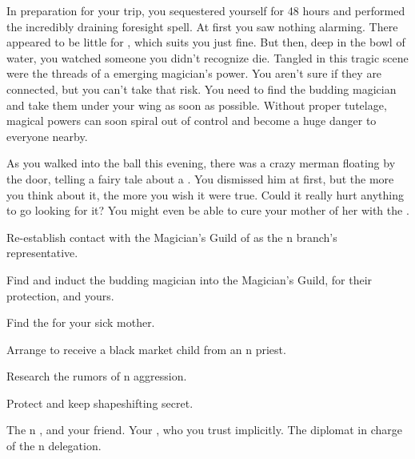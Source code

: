 \documentclass[char]{NeptuneBall}
\begin{document}
In preparation for your trip, you sequestered yourself for 48 hours and performed the incredibly draining foresight spell. At first you saw nothing alarming. There appeared to be little for \cPrince{}, which suits you just fine. But then, deep in the bowl of water, you watched someone you didn't recognize die. Tangled in this tragic scene were the threads of a emerging magician's power. You aren't sure if they are connected, but you can't take that risk. You need to find the budding magician and take them under your wing as soon as possible. Without proper tutelage, magical powers can soon spiral out of control and become a huge danger to everyone nearby.

As you walked into the ball this evening, there was a crazy merman floating by the door, telling a fairy tale about a \iWishingStone{\MYname}. You dismissed him at first, but the more you think about it, the more you wish it were true. Could it really hurt anything to go looking for it? You might even be able to cure your mother of her \ppolio{} with the \iWishingStone{\MYname}.

\begin{itemz}[Goals]
  \item Re-establish contact with the Magician's Guild of \pAtlantis{} as the \pPacifica{}n branch's representative.
  \item Find and induct the budding magician into the Magician's Guild, for their protection, and yours.
	\item Find the \iWishingStone{\MYname} for your sick mother.
  \item Arrange to receive a black market child from an \pAtlantis{}n priest.
  \item Research the rumors of \pIndia{}n aggression.
  \item Protect \cPrince{} and keep \cPrince{\their} shapeshifting secret.
\end{itemz}

\begin{contacts}
  \contact{\cPrince{}} The \pPacifica{}n \cPrince{\Prince}, and your friend.
  \contact{\cSpy{}} Your \cSpy{\sibling}, who you trust implicitly.
  \contact{\cDiplomat{}} The diplomat in charge of the \pPacifica{}n delegation.
\end{contacts}
\end{document}
